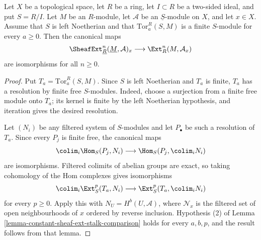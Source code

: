 \begin{lemma}
\label{lemma-constant-sheaf-ext-stalk-noetherian-quotient}
\begin{reference}
\cite[Chapter IV, \S 4.3, Remark 2(b), p. 193]{Tohoku}
\end{reference}
Let $X$ be a topological space, let $R$ be a ring, let $I \subset R$ be a
two-sided ideal, and put $S = R/I$. Let $M$ be an $R$-module, let
$\mathcal{A}$ be an $\underline{S}$-module on $X$, and let $x \in X$.
Assume that $S$ is left Noetherian and that
$\text{Tor}_a^R(S, M)$ is a finite $S$-module for every $a \geq 0$. Then
the canonical maps
$$
\SheafExt^n_{\underline{R}}(\underline{M}, \mathcal{A})_x
\longrightarrow \Ext_R^n(M, \mathcal{A}_x)
$$
are isomorphisms for all $n \geq 0$.
\end{lemma}

\begin{proof}
Put $T_a = \text{Tor}_a^R(S, M)$. Since $S$ is left Noetherian and $T_a$
is finite, $T_a$ has a resolution by finite free $S$-modules. Indeed, choose
a surjection from a finite free module onto $T_a$; its kernel is finite by
the left Noetherian hypothesis, and iteration gives the desired resolution.

Let $(N_i)$ be any filtered system of $S$-modules and let $P_\bullet$ be
such a resolution of $T_a$. Since every $P_j$ is finite free, the canonical
maps
$$
\colim_i \Hom_S(P_j, N_i)
\longrightarrow \Hom_S(P_j, \colim_i N_i)
$$
are isomorphisms. Filtered colimits of abelian groups are exact, so taking
cohomology of the Hom complexes gives isomorphisms
$$
\colim_i \Ext_S^p(T_a, N_i)
\longrightarrow \Ext_S^p(T_a, \colim_i N_i)
$$
for every $p \geq 0$. Apply this with
$N_U = H^b(U, \mathcal{A})$, where $\mathcal{N}_x$ is the filtered set of
open neighbourhoods of $x$ ordered by reverse inclusion. Hypothesis (2) of
Lemma \ref{lemma-constant-sheaf-ext-stalk-comparison} holds for every
$a, b, p$, and the result follows from that lemma.
\end{proof}
